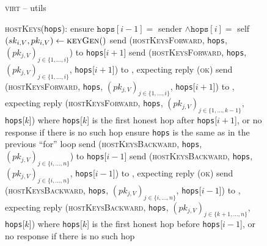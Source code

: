 \begin{figure}[H]
  \begin{processbox}{\textsc{virt} -- utils}
    \begin{algorithmic}[1]
      \State \textsc{hostKeys}(\texttt{hops}): 
      \Indent
         
            \State ensure $\texttt{hops}[i-1] =$ sender $\wedge \texttt{hops}[i]
            =$ self
          \EndIf
          \State $(sk_{i, V}, pk_{i, V}) \gets \textsc{keyGen}()$
            \State send (\textsc{hostKeysForward}, \texttt{hops}, $(pk_{j, V})_{j
            \in \{1, \dots, i\}}$) to \texttt{hops}[$i+1$]
          \Else \: 
              \State send (\textsc{hostKeysForward}, \texttt{hops}, $(pk_{j,
              V})_{j \in \{1, \dots, i\}}$, \texttt{hops}[$i+1$]) to \adversary,
              expecting reply (\textsc{ok})
            \Else \: 
              \State send (\textsc{hostKeysForward}, \texttt{hops}, $(pk_{j,
              V})_{j \in \{1, \dots, i\}}$, \texttt{hops}[$i+1$]) to \adversary,
              expecting reply (\textsc{hostKeysForward}, \texttt{hops}, $(pk_{j,
              V})_{j \in \{1, \dots, k-1\}}$, \texttt{hops}[$k$]) where
              \texttt{hops}[$k$] is the first honest hop after
              \texttt{hops}[$i+1$], or no response if there is no such hop
            \EndIf
          \EndIf
        \EndFor \: 
         
            \State ensure \texttt{hops} is the same as in the previous ``for''
            loop
          \EndIf
            \State send (\textsc{hostKeysBackward}, \texttt{hops}, $(pk_{j,
            V})_{j \in \{i, \dots, n\}}$) to \texttt{hops}[$i-1$]
          \Else \: 
              \State send (\textsc{hostKeysBackward}, \texttt{hops}, $(pk_{j,
              V})_{j \in \{i, \dots, n\}}$, \texttt{hops}[$i-1$]) to \adversary,
              expecting reply (\textsc{ok})
            \Else \: 
              \State send (\textsc{hostKeysBackward}, \texttt{hops}, $(pk_{j,
              V})_{j \in \{i, \dots, n\}}$, \texttt{hops}[$i-1$]) to \adversary,
              expecting reply (\textsc{hostKeysBackward}, \texttt{hops},
              $(pk_{j, V})_{j \in \{k+1, \dots, n\}}$, \texttt{hops}[$k$]) where
              \texttt{hops}[$k$] is the first honest hop before
              \texttt{hops}[$i-1$], or no response if there is no such hop
            \EndIf
          \EndIf
        \EndFor \: 
      \EndIndent
    \end{algorithmic}
  \end{processbox}
  \caption{}
  \label{code:virtual-layer:host-keys}


\end{figure}
